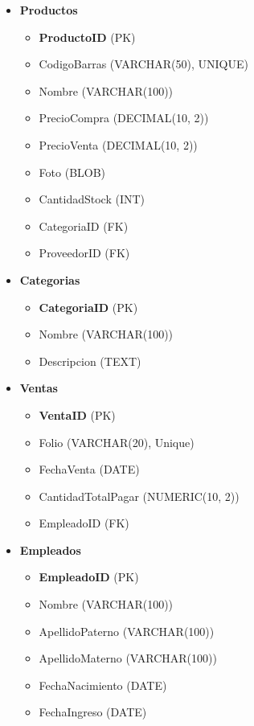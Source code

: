 \documentclass[10pt,openany]{book}
\begin{document}
\begin{itemize}
    \item \textbf{Productos}
        \begin{itemize}
            \item \textbf{ProductoID} (PK)
            \item CodigoBarras (VARCHAR(50), UNIQUE)
            \item Nombre (VARCHAR(100))
            \item PrecioCompra (DECIMAL(10, 2))
            \item PrecioVenta (DECIMAL(10, 2))
            \item Foto (BLOB)
            \item CantidadStock (INT)
            \item CategoriaID (FK)
            \item ProveedorID (FK)
        \end{itemize}
        
    \item \textbf{Categorias}
        \begin{itemize}
            \item \textbf{CategoriaID} (PK)
            \item Nombre (VARCHAR(100))
            \item Descripcion (TEXT)
        \end{itemize}
        
    \item \textbf{Ventas}
        \begin{itemize}
            \item \textbf{VentaID} (PK)
            \item Folio (VARCHAR(20), Unique)
            \item FechaVenta (DATE)
            \item CantidadTotalPagar (NUMERIC(10, 2))
            \item EmpleadoID (FK)
        \end{itemize}
        
    \item \textbf{Empleados}
        \begin{itemize}
            \item \textbf{EmpleadoID} (PK)
            \item Nombre (VARCHAR(100))
            \item ApellidoPaterno (VARCHAR(100))
            \item ApellidoMaterno (VARCHAR(100))
            \item FechaNacimiento (DATE)
            \item FechaIngreso (DATE)
        \end{itemize}
        

\end{itemize}
\end{document}
